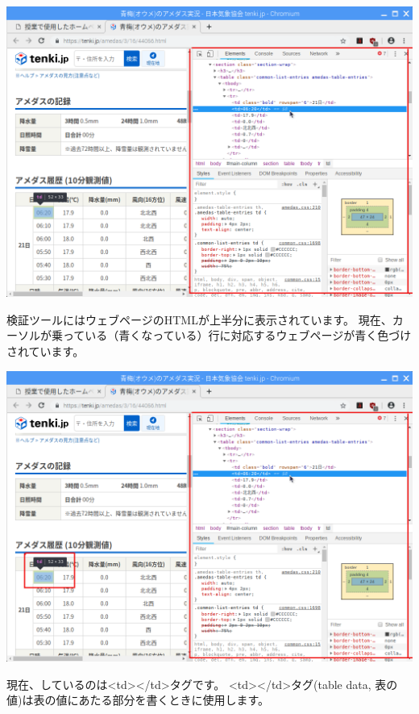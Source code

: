 \documentclass[a4paper,12pt,dvipdfmx]{jarticle}
\begin{document}
\begin{center}
\includegraphics[width=17.006cm]{textbook-img035.png}

\end{center}
検証ツールにはウェブページのHTMLが上半分に表示されています。
現在、カーソルが乗っている（青くなっている）行に対応するウェブページが青く色づけされています。



\begin{center}
\includegraphics[width=17.006cm]{textbook-img035-2.png}

\end{center}
現在、しているのは{\textless}td{\textgreater}{\textless}/td{\textgreater}タグです。
{\textless}td{\textgreater}{\textless}/td{\textgreater}タグ(table
data,
表の値)は表の値にあたる部分を書くときに使用します。
\end{document}
